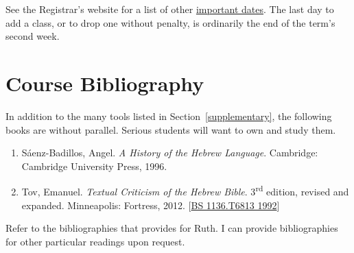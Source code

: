 \documentclass[titlepage]{article}
\begin{document}
See the Registrar's website for a list of other
\href{http://www.tyndale.ca/registrar/important-dates}{important dates}.
The last day to add a class, or to drop one without penalty, is
ordinarily the end of the term's second week.

\section{Course Bibliography}
\label{bibliography}

In addition to the many tools listed in Section~\ref{supplementary}, the
following books are without parallel. Serious students will want to own
and study them.

\begin{enumerate}

	\item Sáenz-Badillos, Angel. \emph{A History of the Hebrew
	Language}. Cambridge: Cambridge University Press, 1996.

	\item Tov, Emanuel. \emph{Textual Criticism of the Hebrew Bible}.
	3\textsuperscript{rd} edition, revised and expanded. Minneapolis:
	Fortress, 2012.
	[\href{http://tyndale.worldcat.org/oclc/26129277}{BS 1136.T6813 1992}]

\end{enumerate}

Refer to the bibliographies that \cite{holm} provides for Ruth. I can
provide bibliographies for other particular readings upon request.
\end{document}
